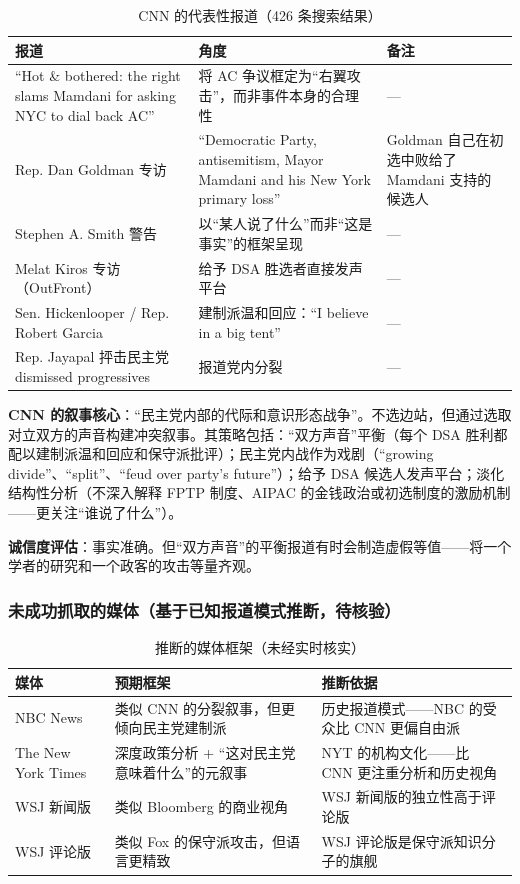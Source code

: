 \documentclass[12pt,a4paper]{ctexart}
\begin{document}
\begin{table}[h]
\centering
\caption{CNN 的代表性报道（426 条搜索结果）}
\begin{tabular}{@{}lp{7.6cm}p{4.6cm}@{}}
\toprule
\textbf{报道} & \textbf{角度} & \textbf{备注} \\
\midrule
``Hot \& bothered: the right slams Mamdani for asking NYC to dial back AC'' & 将 AC 争议框定为``右翼攻击''，而非事件本身的合理性 & --- \\
Rep. Dan Goldman 专访 & ``Democratic Party, antisemitism, Mayor Mamdani and his New York primary loss'' & Goldman 自己在初选中败给了 Mamdani 支持的候选人 \\
Stephen A. Smith 警告 & 以``某人说了什么''而非``这是事实''的框架呈现 & --- \\
Melat Kiros 专访（OutFront） & 给予 DSA 胜选者直接发声平台 & --- \\
Sen. Hickenlooper / Rep. Robert Garcia & 建制派温和回应：``I believe in a big tent'' & --- \\
Rep. Jayapal 抨击民主党 dismissed progressives & 报道党内分裂 & --- \\
\bottomrule
\end{tabular}
\end{table}

\textbf{CNN 的叙事核心}：``民主党内部的代际和意识形态战争''。不选边站，但通过选取对立双方的声音构建冲突叙事。其策略包括：``双方声音''平衡（每个 DSA 胜利都配以建制派温和回应和保守派批评）；民主党内战作为戏剧（``growing divide''、``split''、``feud over party's future''）；给予 DSA 候选人发声平台；淡化结构性分析（不深入解释 FPTP 制度、AIPAC 的金钱政治或初选制度的激励机制——更关注``谁说了什么''）。

\textbf{诚信度评估}：事实准确。但``双方声音''的平衡报道有时会制造虚假等值——将一个学者的研究和一个政客的攻击等量齐观。

\subsubsection{未成功抓取的媒体（基于已知报道模式推断，待核验）}

\begin{table}[h]
\centering
\caption{推断的媒体框架（未经实时核实）}
\begin{tabular}{@{}lp{5.2cm}p{7.2cm}@{}}
\toprule
\textbf{媒体} & \textbf{预期框架} & \textbf{推断依据} \\
\midrule
NBC News & 类似 CNN 的分裂叙事，但更倾向民主党建制派 & 历史报道模式——NBC 的受众比 CNN 更偏自由派 \\
The New York Times & 深度政策分析 + ``这对民主党意味着什么''的元叙事 & NYT 的机构文化——比 CNN 更注重分析和历史视角 \\
WSJ 新闻版 & 类似 Bloomberg 的商业视角 & WSJ 新闻版的独立性高于评论版 \\
WSJ 评论版 & 类似 Fox 的保守派攻击，但语言更精致 & WSJ 评论版是保守派知识分子的旗舰 \\
\bottomrule
\end{tabular}
\end{table}
\end{document}
